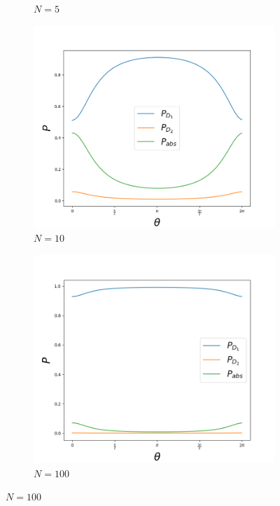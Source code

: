 \documentclass{book}
\begin{document}
\begin{figure}[H]
\begin{subfigure}[b]{0.30\linewidth}
\caption{$N=5$ }
\label{fig:BS1}
\end{subfigure}
\begin{subfigure}[b]{0.30\linewidth}
\includegraphics[width=\linewidth]{images/Azuma_phases10.png}
\caption{$N=10$ }
\label{fig:BS1}
\end{subfigure}
\begin{subfigure}[b]{0.30\linewidth}
\includegraphics[width=\linewidth]{images/Azuma_phases100.png}
\caption{$N=100$}
\end{subfigure}

\end{figure}
\end{document}
